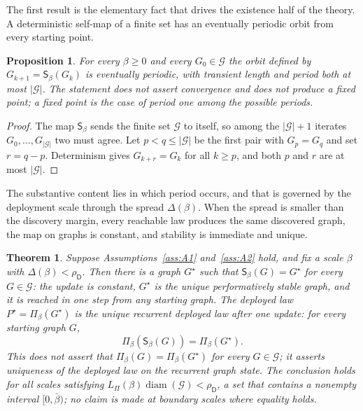 \documentclass[11pt]{article}
\theoremstyle{plain}
\newtheorem{theorem}{Theorem}
\newtheorem{proposition}{Proposition}
\theoremstyle{definition}
\newcommand{\Gcal}{\mathcal{G}}
\newcommand{\Dop}{\mathsf{D}}
\newcommand{\Pidep}{\Pi_\beta}
\newcommand{\Sbeta}{\mathsf{S}_\beta}
\newcommand{\diam}{\operatorname{diam}}
\begin{document}
The first result is the elementary fact that drives the existence half of the theory. A deterministic self-map of a finite set has an eventually periodic orbit from every starting point.

\begin{proposition}\label{prop:periodic}
For every $\beta\ge0$ and every $G_0\in\Gcal$ the orbit defined by $G_{k+1}=\Sbeta(G_k)$ is eventually periodic, with transient length and period both at most $|\Gcal|$. The statement does not assert convergence and does not produce a fixed point; a fixed point is the case of period one among the possible periods.
\end{proposition}

\begin{proof}
The map $\Sbeta$ sends the finite set $\Gcal$ to itself, so among the $|\Gcal|+1$ iterates $G_0,\dots,G_{|\Gcal|}$ two must agree. Let $p<q\le|\Gcal|$ be the first pair with $G_p=G_q$ and set $r=q-p$. Determinism gives $G_{k+r}=G_k$ for all $k\ge p$, and both $p$ and $r$ are at most $|\Gcal|$.
\end{proof}

The substantive content lies in which period occurs, and that is governed by the deployment scale through the spread $\Delta(\beta)$. When the spread is smaller than the discovery margin, every reachable law produces the same discovered graph, the map on graphs is constant, and stability is immediate and unique.

\begin{theorem}\label{thm:threshold}
Suppose Assumptions~\ref{ass:A1} and~\ref{ass:A2} hold, and fix a scale $\beta$ with $\Delta(\beta)<\rho_\Dop$. Then there is a graph $G^\star$ such that $\Sbeta(G)=G^\star$ for every $G\in\Gcal$: the update is constant, $G^\star$ is the unique performatively stable graph, and it is reached in one step from any starting graph. The deployed law $P^\star=\Pidep(G^\star)$ is the unique recurrent deployed law after one update: for every starting graph $G$,
\[
\Pidep(\Sbeta(G))=\Pidep(G^\star).
\]
This does not assert that $\Pidep(G)=\Pidep(G^\star)$ for every $G\in\Gcal$; it asserts uniqueness of the deployed law on the recurrent graph state. The conclusion holds for all scales satisfying $L_\Pi(\beta)\diam(\Gcal)<\rho_\Dop$, a set that contains a nonempty interval $[0,\bar\beta)$; no claim is made at boundary scales where equality holds.
\end{theorem}
\end{document}
